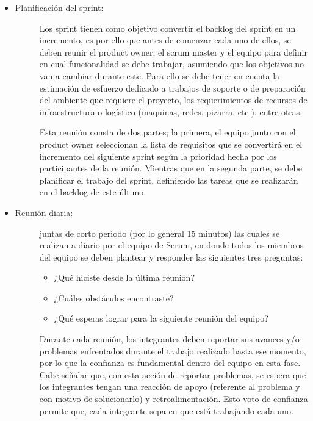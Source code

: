 \begin{itemize}
    \item   \begin{description}
                \item[Planificación del sprint: ] Los sprint tienen como objetivo convertir el backlog del sprint en un incremento, es por ello que antes de comenzar cada uno de ellos, se deben reunir el product owner, el scrum master y el equipo para definir en cual funcionalidad se debe trabajar, asumiendo que los objetivos no van a cambiar durante este. Para ello se debe tener en cuenta la estimación de esfuerzo dedicado a trabajos de soporte o de preparación del ambiente que requiere el proyecto, los requerimientos de recursos de infraestructura o logístico (maquinas, redes, pizarra, etc.), entre otras.
                
                Esta reunión consta de dos partes; la primera, el equipo junto con el product owner seleccionan la lista de requisitos que se convertirá en el incremento del siguiente sprint según la prioridad hecha por los participantes de la reunión. Mientras que en la segunda parte, se debe planificar el trabajo del sprint, definiendo las tareas que se realizarán en el backlog de este último.

            \end{description}

    \item   \begin{description}
                \item[Reunión diaria:] juntas de corto periodo (por lo general 15 minutos) las cuales se realizan a diario por el equipo de Scrum, en donde todos los miembros del equipo se deben plantear y responder las siguientes tres preguntas:  
                
                \begin{itemize}
                    \item ¿Qué hiciste desde la última reunión?

                    \item ¿Cuáles obstáculos encontraste? 

                    \item ¿Qué esperas lograr para la siguiente reunión del equipo?
                \end{itemize}

                Durante cada reunión, los integrantes deben reportar sus avances y/o problemas enfrentados durante el trabajo realizado hasta ese momento, por lo que la confianza es fundamental dentro del equipo en esta fase. Cabe señalar que, con esta acción de reportar problemas, se espera que los integrantes tengan una reacción de apoyo (referente al problema y con motivo de solucionarlo) y retroalimentación. Esto voto de confianza permite que, cada integrante sepa en que está trabajando cada uno.
            \end{description}
    

\end{itemize}
